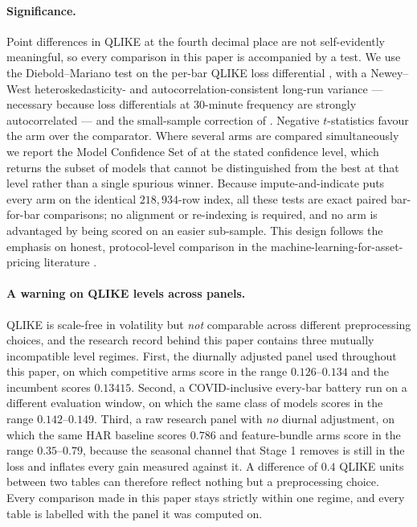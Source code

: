 \paragraph{Significance.}
Point differences in QLIKE at the fourth decimal place are not self-evidently
meaningful, so every comparison in this paper is accompanied by a test. We use
the Diebold--Mariano test on the per-bar QLIKE loss differential
\citep{DieboldMariano1995}, with a Newey--West heteroskedasticity- and
autocorrelation-consistent long-run variance --- necessary because loss
differentials at 30-minute frequency are strongly autocorrelated --- and the
small-sample correction of \citet{HarveyLeybourneNewbold1997}. Negative
$t$-statistics favour the arm over the comparator. Where several arms are
compared simultaneously we report the Model Confidence Set of
\citet{HansenLundeNason2011} at the stated confidence level, which returns the
subset of models that cannot be distinguished from the best at that level rather
than a single spurious winner. Because impute-and-indicate puts every arm on the
identical $218{,}934$-row index, all these tests are exact paired bar-for-bar
comparisons; no alignment or re-indexing is required, and no arm is advantaged by
being scored on an easier sub-sample. This design follows the emphasis on
honest, protocol-level comparison in the machine-learning-for-asset-pricing
literature \citep{gu2020empirical, christensen2023machine}.

\paragraph{A warning on QLIKE levels across panels.}
QLIKE is scale-free in volatility but \emph{not} comparable across different
preprocessing choices, and the research record behind this paper contains three
mutually incompatible level regimes. First, the diurnally adjusted panel used
throughout this paper, on which competitive arms score in the range
$0.126$--$0.134$ and the incumbent scores $0.13415$. Second, a COVID-inclusive
every-bar battery run on a different evaluation window, on which the same class
of models scores in the range $0.142$--$0.149$.
Third, a raw research panel with \emph{no} diurnal adjustment, on which the same
HAR baseline scores $0.786$ and feature-bundle arms score in the range
$0.35$--$0.79$, because the seasonal channel that Stage 1 removes is still in
the loss and inflates every gain measured against it.
A difference of $0.4$ QLIKE units between two tables can therefore reflect
nothing but a preprocessing choice. Every comparison made in this paper stays
strictly within one regime, and every table is labelled with the panel it was
computed on.
